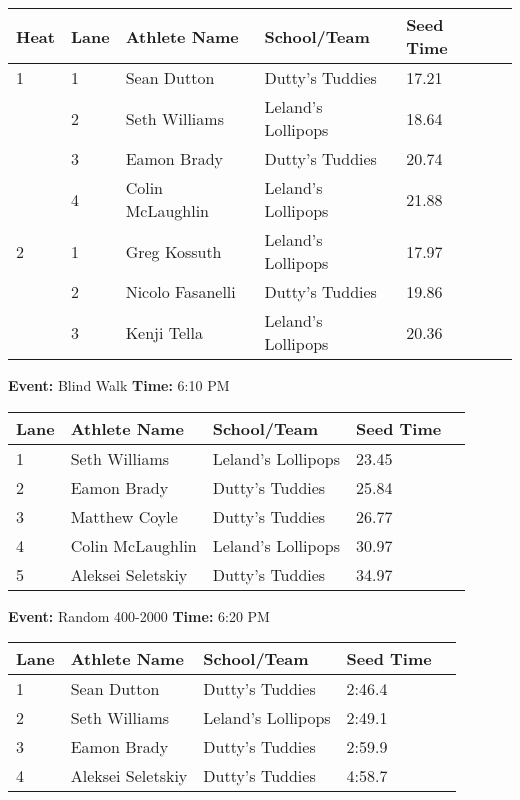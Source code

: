 \documentclass[11pt]{article}
\begin{document}
\vspace{1em}
\begin{tabular}{@{}llllll@{}}
\toprule
\textbf{{Heat}} &
\textbf{Lane} & \textbf{Athlete Name} & \textbf{School/Team} & \textbf{Seed Time} \\
\midrule
1 & 1 & Sean Dutton & Dutty's Tuddies & 17.21 &\\
 & 2 & Seth Williams & Leland's Lollipops & 18.64 &\\
 & 3 & Eamon Brady & Dutty's Tuddies & 20.74 &\\
 & 4 & Colin McLaughlin & Leland's Lollipops & 21.88 &\\
2 & 1 & Greg Kossuth & Leland's Lollipops & 17.97 &\\
 & 2 & Nicolo Fasanelli & Dutty's Tuddies & 19.86 &\\
 & 3 & Kenji Tella & Leland's Lollipops & 20.36 &\\
\bottomrule
\end{tabular}
\vspace{2.5em}


\textbf{Event:} Blind Walk \quad \textbf{Time:} 6:10 PM 

\vspace{1em}
\begin{tabular}{@{}lllll@{}}
\toprule

\textbf{Lane} & \textbf{Athlete Name} & \textbf{School/Team} & \textbf{Seed Time} \\
\midrule
1 & Seth Williams & Leland's Lollipops & 23.45 &\\
2 & Eamon Brady & Dutty's Tuddies & 25.84 &\\
3 & Matthew Coyle & Dutty's Tuddies & 26.77 &\\
4 & Colin McLaughlin & Leland's Lollipops & 30.97 &\\
5 & Aleksei Seletskiy & Dutty's Tuddies & 34.97 &\\
\bottomrule
\end{tabular}
\vspace{2.5em}


\textbf{Event:} Random 400-2000 \quad \textbf{Time:} 6:20 PM 

\vspace{1em}
\begin{tabular}{@{}lllll@{}}
\toprule

\textbf{Lane} & \textbf{Athlete Name} & \textbf{School/Team} & \textbf{Seed Time} \\
\midrule
1 & Sean Dutton & Dutty's Tuddies & 2:46.4 &\\
2 & Seth Williams & Leland's Lollipops & 2:49.1 &\\
3 & Eamon Brady & Dutty's Tuddies & 2:59.9 &\\
4 & Aleksei Seletskiy & Dutty's Tuddies & 4:58.7 &\\
\bottomrule
\end{tabular}
\vspace{2.5em}
\end{document}
